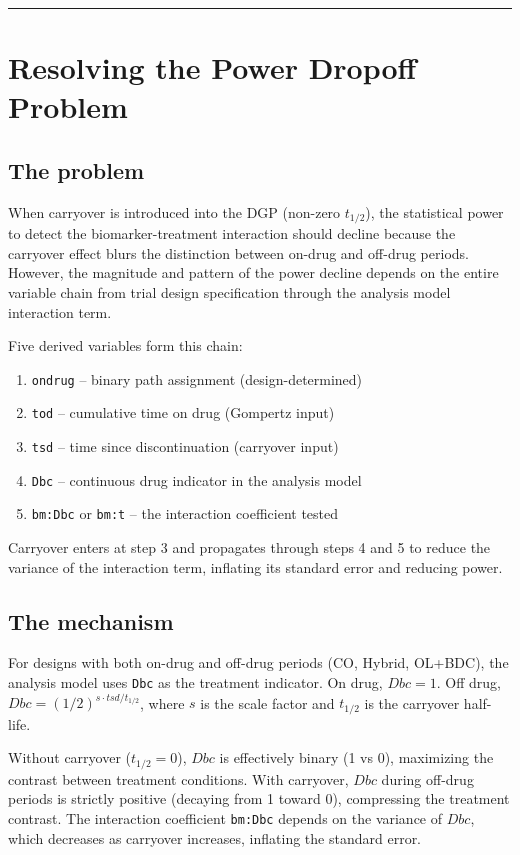 \documentclass[11pt]{article}
\begin{document}
\bigskip\noindent\rule{\textwidth}{0.4pt}\bigskip

\section{Resolving the Power Dropoff Problem}

\subsection{The problem}

When carryover is introduced into the DGP (non-zero $t_{1/2}$),
the statistical power to detect the biomarker-treatment
interaction should decline because the carryover effect blurs the
distinction between on-drug and off-drug periods. However, the
magnitude and pattern of the power decline depends on the entire
variable chain from trial design specification through the
analysis model interaction term.

Five derived variables form this chain:

\begin{enumerate}
  \item \texttt{ondrug} -- binary path assignment (design-determined)
  \item \texttt{tod} -- cumulative time on drug (Gompertz input)
  \item \texttt{tsd} -- time since discontinuation (carryover input)
  \item \texttt{Dbc} -- continuous drug indicator in the analysis model
  \item \texttt{bm:Dbc} or \texttt{bm:t} -- the interaction coefficient tested
\end{enumerate}

Carryover enters at step 3 and propagates through steps 4 and 5
to reduce the variance of the interaction term, inflating its
standard error and reducing power.

\subsection{The mechanism}

For designs with both on-drug and off-drug periods (CO, Hybrid,
OL+BDC), the analysis model uses \texttt{Dbc} as the treatment
indicator. On drug, $Dbc = 1$. Off drug, $Dbc = (1/2)^{s \cdot
tsd / t_{1/2}}$, where $s$ is the scale factor and $t_{1/2}$
is the carryover half-life.

Without carryover ($t_{1/2} = 0$), $Dbc$ is effectively binary
(1 vs 0), maximizing the contrast between treatment conditions.
With carryover, $Dbc$ during off-drug periods is strictly positive
(decaying from 1 toward 0), compressing the treatment contrast.
The interaction coefficient \texttt{bm:Dbc} depends on the variance of
$Dbc$, which decreases as carryover increases, inflating the
standard error.
\end{document}
